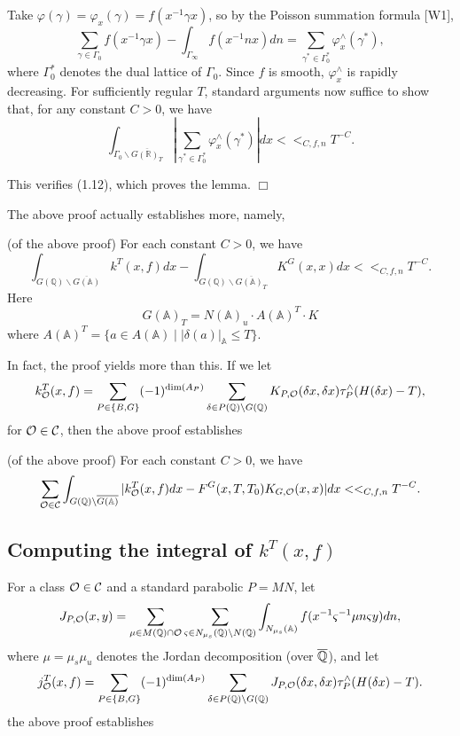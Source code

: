 Take $\varphi (\gamma )=\varphi _x(\gamma )=f(x^{-1}\gamma x)$, so by the
Poisson summation formula [W1], 
\[
\sum_{\gamma \in \Gamma _0}f(x^{-1}\gamma x)-\int_{\Gamma _\infty
}f(x^{-1}nx)dn=\sum_{\gamma ^{*}\in \Gamma _0^{*}}\varphi _x^{\wedge
}(\gamma ^{*}), 
\]
where $\Gamma _0^{*}$ denotes the dual lattice of $\Gamma _0$. Since $f$ is
smooth, $\varphi _x^{\wedge }$ is rapidly decreasing. For sufficiently
regular $T$, standard arguments now suffice to show that, for any constant $%
C>0$, we have 
\[
\int_{\Gamma _0\backslash \overline{G({\mathbb{R}})_T}}|\sum_{\gamma ^{*}\in
\Gamma _0^{*}}\varphi _x^{\wedge }(\gamma ^{*})|dx<<_{C,f,n}T^{-C}. 
\]

This verifies (1.12), which proves the lemma. $\Box $

The above proof actually establishes more, namely,

\begin{corollary}
(of the above proof) For each constant $C>0$, we have 
\[
\int_{G({\mathbb{Q}})\backslash \overline{G({\mathbb{A}})}}k^T(x,f)dx-\int_{G({\mathbb{Q}}%
)\backslash \overline{G({\mathbb{A}})_T}}K^G(x,x)dx<<_{C,f,n}T^{-C}. 
\]
Here 
\[
G({\mathbb{A}})_T=N({\mathbb{A}})_u\cdot A({\mathbb{A}})^T\cdot K 
\]
where $A({\mathbb{A}})^T=\{a\in A({\mathbb{A}})\;|\;|\delta (a)|_{\mathbb A}\leq T\}$.
\end{corollary}

In fact, the proof yields more than this. If we let 
\[
k_{{\cal{O}}}^T(x,f)=\sum_{P\in \{B,G\}}(-1)^{\dim (A_P)}\sum_{\delta \in
P({\mathbb{Q}})\backslash G({\mathbb{Q}})}K_{P,{\cal{O}}}(\delta x,\delta x)\tau
_P^{\wedge }(H(\delta x)-T), 
\]
for ${\cal{O}}\in {\cal{C}}$, then the above proof establishes

\begin{corollary}
(of the above proof) For each constant $C>0$, we have 
\[
\sum_{{\cal{O}}\in {\cal{C}}}\int_{G({\mathbb{Q}})\backslash \overline{G(\mathbb{%
A})}}|k_{{\cal{O}}}^T(x,f)dx-F^G(x,T,T_0)K_{G,{\cal{O}}%
}(x,x)|dx<<_{C,f,n}T^{-C}. 
\]
\end{corollary}

\subsection{Computing the integral of $k^T(x,f)$}

For a class ${\cal{O}}\in {\cal{C}}$ and a standard parabolic $P=MN$,
let 
\[
J_{P,{\cal{O}}}(x,y)=\sum_{\mu \in M({\mathbb{Q}})\cap {\cal{O}}%
}\sum_{\varsigma \in N_{\mu _s}({\mathbb{Q}})\backslash N({\mathbb{Q}})}\int_{N_{\mu
_s}({\mathbb{A}})}f(x^{-1}\varsigma ^{-1}\mu n\varsigma y)dn, 
\]
where $\mu =\mu _s\mu _u$ denotes the Jordan decomposition (over $\overline{%
{\mathbb{Q}}}$), and let 
\[
j_{{\cal{O}}}^T(x,f)=\sum_{P\in \{B,G\}}(-1)^{\dim (A_P)}\sum_{\delta \in
P({\mathbb{Q}})\backslash G({\mathbb{Q}})}J_{P,{\cal{O}}}(\delta x,\delta x)\tau
_P^{\wedge }(H(\delta x)-T). 
\]
the above proof establishes

